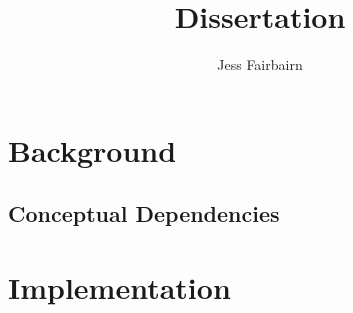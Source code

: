 \documentclass{article}
\author{Jess Fairbairn}
\title{Dissertation}
\begin{document}
        \maketitle
        \section{Background}
        \subsection{Conceptual Dependencies}
        
    
        \section{Implementation}
         

        
        
    
\end{document}

